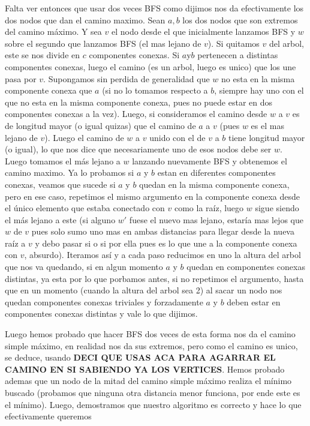\documentclass[A4paper,oneside,fleqn,11pt]{article}
\theoremstyle{definition}
\begin{document}
Falta ver entonces que usar dos veces BFS como dijimos nos da efectivamente los dos nodos que dan el camino maximo. Sean $a,b$ los dos nodos que son extremos del camino máximo. Y sea $v$ el nodo desde el que inicialmente lanzamos BFS y $w$ sobre el segundo que lanzamos BFS (el mas lejano de $v$). Si quitamos $v$ del arbol, este se nos divide en $c$ componentes conexas. Si $a $y$ b$ pertenecen a distintas componentes conexas, luego el camino (es un arbol, luego es unico) que los une pasa por $v$. Supongamos sin perdida de generalidad que $w$ no esta en la misma componente conexa que $a$ (si no lo tomamos respecto a $b$, siempre hay uno con el que no esta en la misma componente conexa, pues no puede estar en dos componentes conexas a la vez). Luego, si consideramos el camino desde $w$ a $v$ es de longitud mayor (o igual quizas) que el camino de $a$ a $v$ (pues $w$ es el mas lejano de $v$). Luego el camino de $w$ a $v$ unido con el de $v$ a $b$ tiene longitud mayor (o igual), lo que nos dice que necesariamente uno de esos nodos debe ser $w$. Luego tomamos el más lejano a $w$ lanzando nuevamente BFS y obtenemos el camino maximo. Ya lo probamos si $a$ y $b$ estan en diferentes componentes conexas, veamos que sucede si $a$ y $b$ quedan en la misma componente conexa, pero en ese caso, repetimos el mismo argumento en la componente conexa desde el único elemento que estaba conectado con $v$ como la raíz, luego $w$ sigue siendo el más lejano a este (si alguno $w'$ fuese el nuevo mas lejano, estaría mas lejos que $w$ de $v$ pues solo sumo uno mas en ambas distancias para llegar desde la nueva raíz a $v$ y debo pasar si o si por ella pues es lo que une a la componente conexa con $v$, absurdo). Iteramos así y a cada paso reducimos en uno la altura del arbol que nos va quedando, si en algun momento $a$ y $b$ quedan en componentes conexas distintas, ya esta por lo que porbamos antes, si no repetimos el argumento, hasta que en un momento (cuando la altura del arbol sea 2) al sacar un nodo nos quedan componentes conexas triviales y forzadamente $a$ y $b$ deben estar en componentes conexas distintas y vale lo que dijimos.

Luego hemos probado que hacer BFS dos veces de esta forma nos da el camino simple máximo, en realidad nos da sus extremos, pero como el camino es unico, se deduce, usando \textbf{DECI QUE USAS ACA PARA AGARRAR EL CAMINO EN SI SABIENDO YA LOS VERTICES}. Hemos probado ademas que un nodo de la mitad del camino simple máximo realiza el mínimo buscado (probamos que ninguna otra distancia menor funciona, por ende este es el mínimo). Luego, demostramos que nuestro algoritmo es correcto y hace lo que efectivamente queremos
\end{document}
